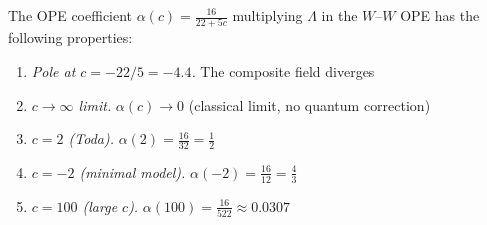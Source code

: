 \begin{theorem}\label{thm:c-scaling}
The OPE coefficient $\alpha(c) = \frac{16}{22+5c}$ multiplying $\Lambda$ in the $W$--$W$ OPE has the following properties:
\begin{enumerate}
\item \emph{Pole at $c = -22/5 = -4.4$.} The composite field diverges
\item \emph{$c \to \infty$ limit.} $\alpha(c) \to 0$ (classical limit, no quantum correction)
\item \emph{$c = 2$ (Toda).} $\alpha(2) = \frac{16}{32} = \frac{1}{2}$
\item \emph{$c = -2$ (minimal model).} $\alpha(-2) = \frac{16}{12} = \frac{4}{3}$
\item \emph{$c = 100$ (large $c$).} $\alpha(100) = \frac{16}{522} \approx 0.0307$
\end{enumerate}
\end{theorem}


